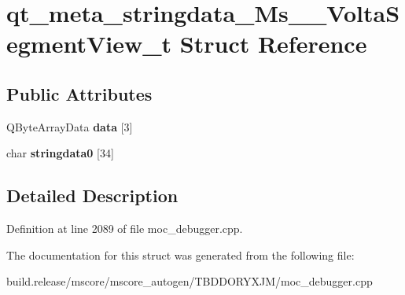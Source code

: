 \hypertarget{structqt__meta__stringdata___ms_____volta_segment_view__t}{}\section{qt\+\_\+meta\+\_\+stringdata\+\_\+\+Ms\+\_\+\+\_\+\+Volta\+Segment\+View\+\_\+t Struct Reference}
\label{structqt__meta__stringdata___ms_____volta_segment_view__t}
\subsection*{Public Attributes}
\begin{DoxyCompactItemize}
\item 
\mbox{\label{structqt__meta__stringdata___ms_____volta_segment_view__t_a8372d3d89627b2c3ecfcbd485f4629fb}} 
Q\+Byte\+Array\+Data {\bfseries data} \mbox{[}3\mbox{]}
\item 
\mbox{\label{structqt__meta__stringdata___ms_____volta_segment_view__t_a92d81f3178c59eb1e15454d914c3e475}} 
char {\bfseries stringdata0} \mbox{[}34\mbox{]}
\end{DoxyCompactItemize}


\subsection{Detailed Description}


Definition at line 2089 of file moc\+\_\+debugger.\+cpp.



The documentation for this struct was generated from the following file\+:\begin{DoxyCompactItemize}
\item 
build.\+release/mscore/mscore\+\_\+autogen/\+T\+B\+D\+D\+O\+R\+Y\+X\+J\+M/moc\+\_\+debugger.\+cpp\end{DoxyCompactItemize}
